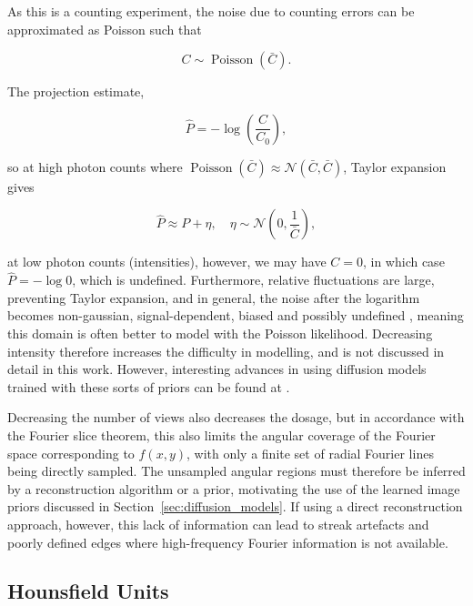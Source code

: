 As this is a counting experiment, the noise due to counting errors can be approximated as Poisson such that

\begin{equation}
C\sim \operatorname{Poisson}(\bar C).
\label{eq:poisson_photon_count}
\end{equation}

The projection estimate,

\begin{equation}
\hat P =-\log \left(\frac{C}{C_0}\right),
\label{eq:projection_estimate_photon_count}
\end{equation}

so at high photon counts where $\operatorname{Poisson}(\bar C)\approx \mathcal{N}(\bar C, \bar C)$, Taylor expansion gives

\begin{equation}
\hat P \approx P+\eta, \quad \eta \sim \mathcal N\left(0, \frac{1}{\bar C}\right),
\label{eq:log_projection_gaussian_approximation}
\end{equation}

at low photon counts (intensities), however, we may have $C=0$, in which case $\hat P=-\log 0$, which is undefined. Furthermore, relative fluctuations are large, preventing Taylor expansion, and in general, the noise after the logarithm becomes non-gaussian, signal-dependent, biased and possibly undefined \cite{}, meaning this domain is often better to model with the Poisson likelihood. Decreasing intensity therefore increases the difficulty in modelling, and is not discussed in detail in this work. However, interesting advances in using diffusion models trained with these sorts of priors can be found at \cite{}.

Decreasing the number of views also decreases the dosage, but in accordance with the Fourier slice theorem, this also limits the angular coverage of the Fourier space corresponding to $f(x,y)$, with only a finite set of radial Fourier lines being directly sampled. The unsampled angular regions must therefore be inferred by a reconstruction algorithm or a prior, motivating the use of the learned image priors discussed in Section~\ref{sec:diffusion_models}. If using a direct reconstruction approach, however, this lack of information can lead to streak artefacts and poorly defined edges where high-frequency Fourier information is not available.

\subsection{Hounsfield Units}
\label{subsec:hounsfield_units}

